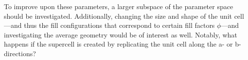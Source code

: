     To improve upon these parameters, a larger subspace of the parameter space should be investigated. Additionally, changing the size and shape of the unit cell---and thus the fill configurations that correspond to certain fill factors $\phi$---and investigating the average geometry would be of interest as well. Notably, what happens if the supercell is created by replicating the unit cell along the a- or b-directions? 